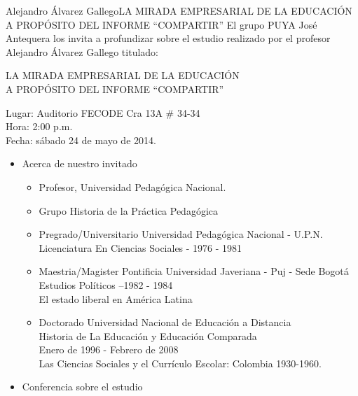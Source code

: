 \documentclass{beamer}
\begin{document}
\begin{frame}{Alejandro Álvarez Gallego}{LA MIRADA EMPRESARIAL DE LA EDUCACIÓN\\
A PROPÓSITO DEL INFORME “COMPARTIR”}
El grupo PUYA José Antequera los invita a profundizar sobre el estudio realizado por el profesor Alejandro Álvarez Gallego titulado:
\vspace*{10pt}
\begin{center}
\Large LA MIRADA EMPRESARIAL DE LA EDUCACIÓN\\
A PROPÓSITO DEL INFORME “COMPARTIR”
\end{center}
\vspace*{10pt}
Lugar: Auditorio FECODE Cra 13A \# 34-34\\
Hora: 2:00 p.m.\\
Fecha: sábado 24 de mayo de 2014.
\vspace*{20pt}
  \begin{itemize}
  \item 
    Acerca de nuestro invitado
    \begin{itemize}
    \item
      Profesor, Universidad Pedagógica Nacional.
    \item
      Grupo Historia de la Práctica Pedagógica
    \end{itemize}

    \begin{itemize}
    \item
      Pregrado/Universitario Universidad Pedagógica Nacional - U.P.N.\\
Licenciatura En Ciencias Sociales - 1976 - 1981
    \item
	Maestria/Magister Pontificia Universidad Javeriana - Puj - Sede Bogotá\\
Estudios Políticos --1982 - 1984\\
El estado liberal en América Latina
    \item
      Doctorado Universidad Nacional de Educación a Distancia\\
Historia de La Educación y Educación Comparada\\
Enero de 1996 - Febrero de 2008\\
Las Ciencias Sociales y el Currículo Escolar: Colombia 1930-1960.\\
    \end{itemize}
  \item
    Conferencia sobre el estudio

  \end{itemize}
\end{frame}
\end{document}
